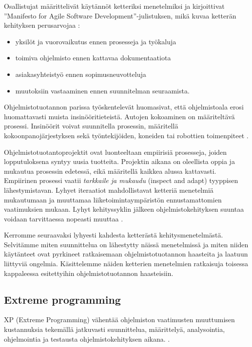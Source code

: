 \documentclass[finnish]{tktltiki2}
\theoremstyle{definition}
\theoremstyle{remark}
\begin{document}
{Osallistujat määrittelivät käytännöt ketteriksi menetelmiksi ja kirjoittivat ''Manifesto for Agile Software Development''-julistuksen, mikä kuvaa ketterän kehityksen perusarvojaa \cite{WIC03}:

\begin{itemize}
\item yksilöt ja vuorovaikutus ennen prosesseja ja työkaluja
\item toimiva ohjelmisto ennen kattavaa dokumentaatiota
\item asiakasyhteistyö ennen sopimusneuvotteluja
\item muutoksiin vastaaminen ennen suunnitelman seuraamista.
\end{itemize}

Ohjelmistotuotannon parissa työskentelevät huomasivat, että ohjelmistoala erosi huomattavasti muista insinööritieteistä. Autojen kokoaminen on määriteltävä prosessi. Insinöörit voivat suunnitella prosessin, määritellä kokoonpanojärjestyksen sekä työntekijöiden, koneiden tai robottien toimenpiteet \cite{WIC03}.

Ohjelmistotuotantoprojektit ovat luonteeltaan empiirisiä prosesseja, joiden lopputuloksena syntyy uusia tuotteita. Projektin aikana on oleellista oppia ja mukautua prosessin edetessä, eikä määritellä kaikkea alussa kattavasti. Empiirinen prosessi vaatii \textit{tarkkaile ja mukaudu} (inspect and adapt) tyyppisen lähestymistavan. Lyhyet iteraatiot mahdollistavat ketteriä menetelmiä mukautumaan ja muuttamaa liiketoimintaympäristön ennustamattomien vaatimuksien mukaan. Lyhyt kehityssyklin jälkeen ohjelmistokehityksen suuntaa voidaan tarvittaessa nopeasti muuttaa  \cite{WIC03}.

Kerromme seuraavaksi lyhyesti kahdesta ketterästä kehitysmenetelmästä. Selvitämme miten suunnittelua on lähestytty näissä menetelmissä ja miten niiden käytänteet ovat pyrkineet ratkaisemaan ohjelmistotuotannon haasteita ja laatuun liittyviä ongelmia. Käsittelemme näiden ketterien menetelmien ratkaisuja toisessa kappaleessa esitettyihin ohjelmistotuotannon haasteisiin. 

\subsection{Extreme programming}

XP (Extreme Programming) vähentää ohjelmiston vaatimusten muuttumisen kustannuksia tekemällä jatkuvasti suunnittelua, määrittelyä, analysointia, ohjelmointia ja testausta ohjelmistokehityksen aikana.  \cite{BEC99}.

}
\end{document}
